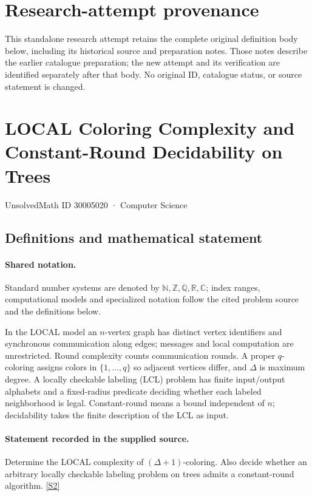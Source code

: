 \documentclass[11pt]{article}
\begin{document}
\section*{Research-attempt provenance}
This standalone research attempt retains the complete original definition body below,
including its historical source and preparation notes. Those notes describe the
earlier catalogue preparation; the new attempt and its verification are identified
separately after that body. No original ID, catalogue status, or source statement is changed.

\section{LOCAL Coloring Complexity and Constant-Round Decidability on Trees}\label{30005020}
{\small UnsolvedMath ID 30005020 · Computer Science}
\subsection{Definitions and mathematical statement}

\paragraph{Shared notation.}Standard number systems are denoted by $\mathbb N,\mathbb Z,\mathbb Q,\mathbb R,\mathbb C$; index ranges, computational models and specialized notation follow the cited problem source and the definitions below.


In the LOCAL model an $n$-vertex graph has distinct vertex identifiers and synchronous communication along edges; messages and local computation are unrestricted. Round complexity counts communication rounds. A proper $q$-coloring assigns colors in $\{1,\ldots,q\}$ so adjacent vertices differ, and $\Delta$ is maximum degree. A locally checkable labeling (LCL) problem has finite input/output alphabets and a fixed-radius predicate deciding whether each labeled neighborhood is legal. Constant-round means a bound independent of $n$; decidability takes the finite description of the LCL as input.
\paragraph{Statement recorded in the supplied source.}
Determine the LOCAL complexity of $(\Delta+1)$-coloring. Also decide whether an arbitrary locally checkable labeling problem on trees admits a constant-round algorithm. \href{https://doi.org/10.4171/owr/2022/8}{[S2]}
\end{document}
